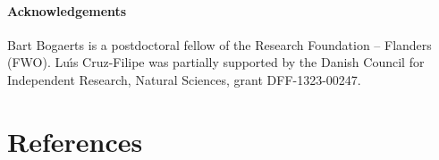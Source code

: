\documentclass[3p,number,authoryear]{elsarticle}
\begin{document}
\paragraph{Acknowledgements}
Bart Bogaerts is a postdoctoral fellow of the Research Foundation -- Flanders (FWO).
Lu\'\i s Cruz-Filipe was partially supported by the Danish Council for Independent Research, Natural Sciences, grant DFF-1323-00247.

\newpage
\section*{References}


\end{document}
